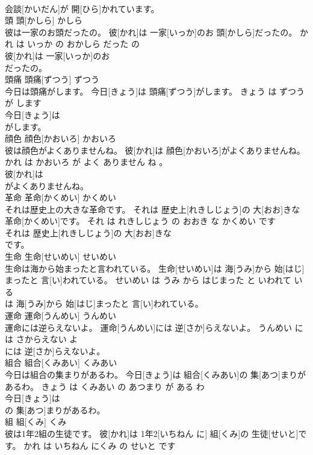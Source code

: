 \documentclass[8pt]{extreport}
\begin{document}
\begin{CJK}{UTF8}{min}
\\	会談[かいだん]が 開[ひら]かれています。			
\\	頭	頭[かしら]	かしら	
\\	彼は一家のお頭だったの。	彼[かれ]は 一家[いっか]のお 頭[かしら]だったの。	かれ は いっか の おかしら だった の	
\\	彼[かれ]は 一家[いっか]のお
\\	だったの。			
\\	頭痛	頭痛[ずつう]	ずつう	
\\	今日は頭痛がします。	今日[きょう]は 頭痛[ずつう]がします。	きょう は ずつう が します	
\\	今日[きょう]は
\\	がします。			
\\	顔色	顔色[かおいろ]	かおいろ	
\\	彼は顔色がよくありませんね。	彼[かれ]は 顔色[かおいろ]がよくありませんね。	かれ は かおいろ が よく ありません ね 。	
\\	彼[かれ]は
\\	がよくありませんね。			
\\	革命	革命[かくめい]	かくめい	
\\	それは歴史上の大きな革命です。	それは 歴史上[れきしじょう]の 大[おお]きな 革命[かくめい]です。	それ は れきしじょう の おおき な かくめい です	
\\	それは 歴史上[れきしじょう]の 大[おお]きな
\\	です。			
\\	生命	生命[せいめい]	せいめい	
\\	生命は海から始まったと言われている。	生命[せいめい]は 海[うみ]から 始[はじ]まったと 言[い]われている。	せいめい は うみ から はじまった と いわれて いる	
\\	は 海[うみ]から 始[はじ]まったと 言[い]われている。			
\\	運命	運命[うんめい]	うんめい	
\\	運命には逆らえないよ。	運命[うんめい]には 逆[さか]らえないよ。	うんめい に は さからえない よ	
\\	には 逆[さか]らえないよ。			
\\	組合	組合[くみあい]	くみあい	
\\	今日は組合の集まりがあるわ。	今日[きょう]は 組合[くみあい]の 集[あつ]まりがあるわ。	きょう は くみあい の あつまり が ある わ	
\\	今日[きょう]は
\\	の 集[あつ]まりがあるわ。			
\\	組	組[くみ]	くみ	
\\	彼は1年2組の生徒です。	彼[かれ]は 1年2[いちねん に] 組[くみ]の 生徒[せいと]です。	かれ は いちねん にくみ の せいと です	

\end{CJK}
\end{document}
